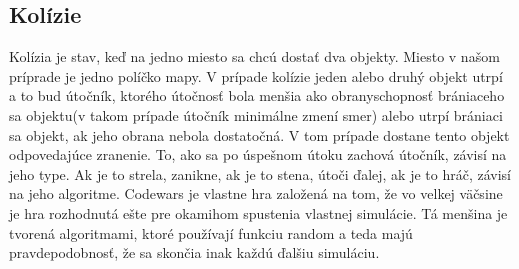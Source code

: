 \subsection{Kolízie}
Kolízia je stav, keď na jedno miesto sa chcú dostať dva objekty. Miesto v našom príprade je jedno políčko mapy. V prípade kolízie jeden alebo druhý objekt utrpí a to bud útočník, ktorého útočnosť bola menšia ako obranyschopnosť brániaceho sa objektu(v takom prípade útočník minimálne zmení smer) alebo utrpí brániaci sa objekt, ak jeho obrana nebola dostatočná. V tom prípade dostane tento objekt odpovedajúce zranenie. To, ako sa po úspešnom útoku zachová útočník, závisí na jeho type. Ak je to strela, zanikne, ak je to stena, útoči ďalej, ak je to hráč, závisí na jeho algoritme.
Codewars je vlastne hra založená na tom, že vo velkej väčsine je hra rozhodnutá ešte pre okamihom spustenia vlastnej simulácie. Tá menšina je tvorená algoritmami, ktoré používají funkciu random a teda majú pravdepodobnosť, že sa skončia inak každú ďalšiu simuláciu.
